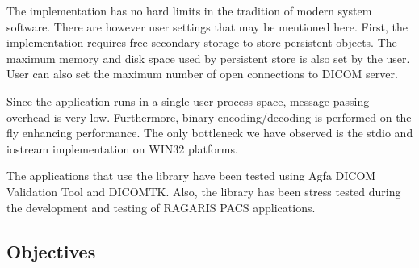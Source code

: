 \documentclass[a4paper,10pt]{article}
\begin{document}
The implementation has no hard limits in the tradition of
modern system software. There are however user settings
that may be mentioned here. First, the implementation requires
free secondary storage to store persistent objects. The maximum
memory and disk space used by persistent store is also set by the
user. User can also set the maximum number of open connections
to DICOM server.

Since the application runs in a single user process space, 
message passing overhead is very low. Furthermore, 
binary encoding/decoding is performed on the fly enhancing
performance. The only bottleneck we have observed is
the stdio and iostream implementation on WIN32 platforms.

The applications that use the library have been tested using
Agfa DICOM Validation Tool and DICOMTK. Also, the library has
been stress tested during the development and testing of
RAGARIS PACS applications.

\subsection{Objectives}
\end{document}
